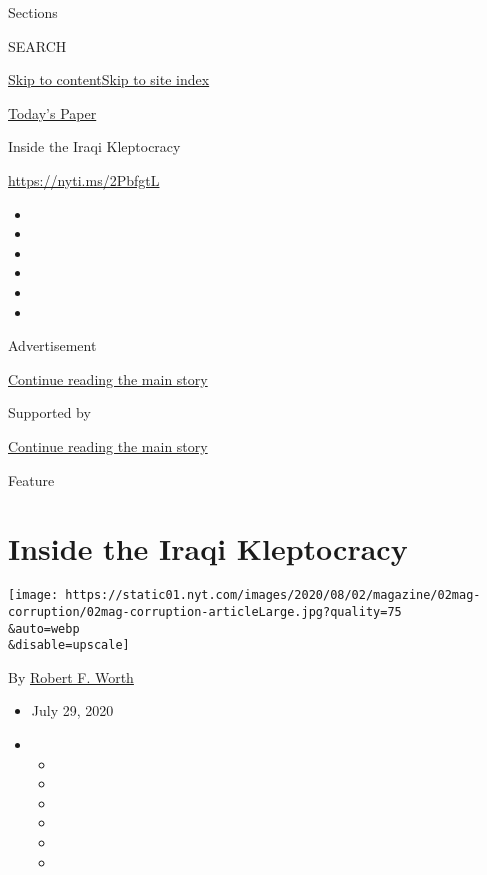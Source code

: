 Sections

SEARCH

\protect\hyperlink{site-content}{Skip to
content}\protect\hyperlink{site-index}{Skip to site index}

\href{https://myaccount.nytimes.com/auth/login?response_type=cookie\&client_id=vi}{}

\href{https://www.nytimes.com/section/todayspaper}{Today's Paper}

Inside the Iraqi Kleptocracy

\url{https://nyti.ms/2PbfgtL}

\begin{itemize}
\item
\item
\item
\item
\item
\item
\end{itemize}

Advertisement

\protect\hyperlink{after-top}{Continue reading the main story}

Supported by

\protect\hyperlink{after-sponsor}{Continue reading the main story}

Feature

\hypertarget{inside-the-iraqi-kleptocracy}{%
\section{Inside the Iraqi
Kleptocracy}\label{inside-the-iraqi-kleptocracy}}

\texttt{[image: https://static01.nyt.com/images/2020/08/02/magazine/02mag-corruption/02mag-corruption-articleLarge.jpg?quality=75\\\&auto=webp\\\&disable=upscale]}

By \href{https://www.nytimes.com/by/robert-f-worth}{Robert F. Worth}

\begin{itemize}
\item
  July 29, 2020
\item
  \begin{itemize}
  \item
  \item
  \item
  \item
  \item
  \item
  \end{itemize}
\end{itemize}

